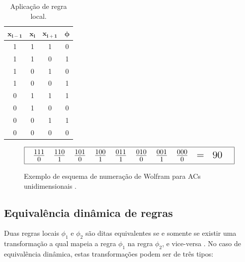 \documentclass[12pt,a4paper]{article}
\begin{document}
\begin{table}[htp]
\begin{center}
\begin{tabular}{|c|c|c|c|}
\hline
$\mathbf{x_{i-1}}$ & $\mathbf{x_i}$ & $\mathbf{x_{i+1}}$ & $\mathbf{\phi}$ \\ \hline
1 & 1 & 1 & 0 \\ \hline
1 & 1 & 0 & 1 \\ \hline
1 & 0 & 1 & 0 \\ \hline
1 & 0 & 0 & 1 \\ \hline
0 & 1 & 1 & 1 \\ \hline
0 & 1 & 0 & 0 \\ \hline
0 & 0 & 1 & 1 \\ \hline
0 & 0 & 0 & 0 \\ \hline
\end{tabular}
\caption{Aplicação de regra local.}
\label{tab:localrule}
\end{center}
\end{table}

\begin{figure}[htp]
\begin{center}
\[ \fbox {
{\Large
\begin{tabular}{c c c c c c c c c c c}
$\frac{1 1 1}{0}$ & $\frac{1 1 0}{1}$ & $\frac{1 0 1}{0}$ & $\frac{1 0 0}{1}$ & 
$\frac{0 1 1}{1}$ & $\frac{0 1 0}{0}$ & $\frac{0 0 1}{1}$ & $\frac{0 0 0}{0}$ &
= & 90
\end{tabular}
}
} \]
\caption{Exemplo de esquema de numeração de Wolfram para ACs unidimensionais
.}
\label{fig:celnumbering}
\end{center}
\end{figure}

\subsection{Equivalência dinâmica de regras}

Duas regras locais ${\phi}_1$ e ${\phi}_2$ são ditas equivalentes se e somente se existir
uma transformação a qual mapeia a regra ${\phi}_1$ na regra ${\phi}_2$, e vice-versa
. No caso de equivalência dinâmica, estas transformações
podem ser de três tipos:
\end{document}
